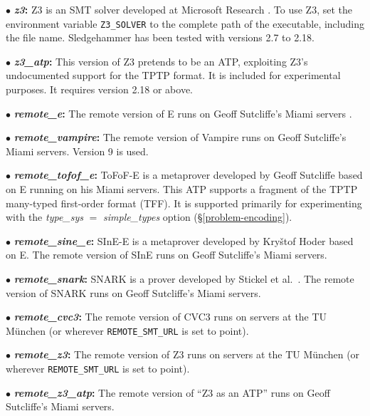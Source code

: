 \documentclass[a4paper,12pt]{article}
\begin{document}
\begin{enum}
\begin{enum}
\item[$\bullet$] \textbf{\textit{z3}:} Z3 is an SMT solver developed at
Microsoft Research \cite{z3}. To use Z3, set the environment variable
\texttt{Z3\_SOLVER} to the complete path of the executable, including the file
name. Sledgehammer has been tested with versions 2.7 to 2.18.

\item[$\bullet$] \textbf{\textit{z3\_atp}:} This version of Z3 pretends to be an
ATP, exploiting Z3's undocumented support for the TPTP format. It is included
for experimental purposes. It requires version 2.18 or above.

\item[$\bullet$] \textbf{\textit{remote\_e}:} The remote version of E runs
on Geoff Sutcliffe's Miami servers \cite{sutcliffe-2000}.

\item[$\bullet$] \textbf{\textit{remote\_vampire}:} The remote version of
Vampire runs on Geoff Sutcliffe's Miami servers. Version 9 is used.

\item[$\bullet$] \textbf{\textit{remote\_tofof\_e}:} ToFoF-E is a metaprover
developed by Geoff Sutcliffe \cite{tofof} based on E running on his Miami
servers. This ATP supports a fragment of the TPTP many-typed first-order format
(TFF). It is supported primarily for experimenting with the
\textit{type\_sys} $=$ \textit{simple\_types} option (\S\ref{problem-encoding}).

\item[$\bullet$] \textbf{\textit{remote\_sine\_e}:} SInE-E is a metaprover
developed by Kry\v stof Hoder \cite{sine} based on E. The remote version of
SInE runs on Geoff Sutcliffe's Miami servers.

\item[$\bullet$] \textbf{\textit{remote\_snark}:} SNARK is a prover
developed by Stickel et al.\ \cite{snark}. The remote version of
SNARK runs on Geoff Sutcliffe's Miami servers.

\item[$\bullet$] \textbf{\textit{remote\_cvc3}:} The remote version of CVC3 runs
on servers at the TU M\"unchen (or wherever \texttt{REMOTE\_SMT\_URL} is set to
point).

\item[$\bullet$] \textbf{\textit{remote\_z3}:} The remote version of Z3 runs on
servers at the TU M\"unchen (or wherever \texttt{REMOTE\_SMT\_URL} is set to
point).

\item[$\bullet$] \textbf{\textit{remote\_z3\_atp}:} The remote version of ``Z3
as an ATP'' runs on Geoff Sutcliffe's Miami servers.
\end{enum}


\end{enum}
\end{document}
